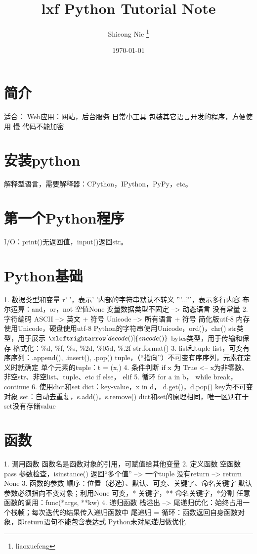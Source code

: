 \documentclass{report}
\title{lxf Python Tutorial Note}
\author{Shicong Nie \thanks{liaoxuefeng}}
\date{\today}
\begin{document}
\begin{titlepage}
    \maketitle
\end{titlepage}

\tableofcontents

\section{简介}
适合： Web应用：网站，后台服务
      日常小工具
      包装其它语言开发的程序，方便使用
慢
代码不能加密
\section{安装python}
解释型语言，需要解释器：CPython，IPython，PyPy，etc。
\section{第一个Python程序}
I/O：print()无返回值，input()返回str。
\section{Python基础}
1. 数据类型和变量
   r' '，表示' '内部的字符串默认不转义
   '''...'''，表示多行内容
   布尔运算：and，or，not
   空值None
   变量数据类型不固定 --> 动态语言
   没有常量
2. 字符编码
   ASCII --> 英文 + 符号
   Unicode --> 所有语言 + 符号
   简化版utf-8
   内存使用Unicode，硬盘使用utf-8
   Python的字符串使用Unicode，ord()，chr()
   str类型，用于展示 $\xleftrightarrow[decode()]{encode()}$ bytes类型，用于传输和保存
   格式化：\%d, \%f, \%s, \%2d, \%05d, \%.2f
   str.format()
3. list和tuple
   list，可变有序序列：.append(), .insert(), .pop()
   tuple，（“指向”）不可变有序序列，元素在定义时就确定
   单个元素的tuple：t = (x,)
4. 条件判断
   if x 为 True <-- x为非零数、非空str、非空list、tuple、etc
   if else， elif
5. 循环
   for a in b， while
   break， continue
6. 使用dict和set
   dict：key-value，x in d， d.get()，d.pop()
   key为不可变对象
   set：自动去重复，s.add()，s.remove() 
   dict和set的原理相同，唯一区别在于set没有存储value
\section{函数}
1. 调用函数
   函数名是函数对象的引用，可赋值给其他变量
2. 定义函数
   空函数pass
   参数检查，isinstance()
   返回“多个值” --> 一个tuple
   没有return --> return None 
3. 函数的参数
   顺序：位置（必选）、默认、可变、关键字、命名关键字
   默认参数必须指向不变对象；利用None 
   可变，*
   关键字，**
   命名关键字，*分割
   任意函数的调用：func(*args, **kw)
4. 递归函数
   栈溢出 --> 尾递归优化：始终占用一个栈帧；每次迭代的结果传入递归函数中
   尾递归 = 循环：函数返回自身函数对象，即return语句不能包含表达式
   Python未对尾递归做优化
\end{document}
